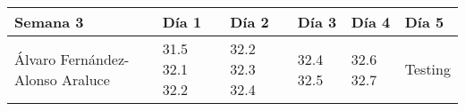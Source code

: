 \begin{table}[h]
	\centering
	\begin{tabular}{| p{2cm} | p{2cm} | p{2cm} | p{2cm} | p{2cm} | p{2cm} |}
		\rowcolor[HTML]{329A9D} 
		{\color[HTML]{FFFFFF} \textbf{Semana 3}} & {\color[HTML]{FFFFFF} \textbf{Día 1}} & {\color[HTML]{FFFFFF} \textbf{Día 2}} & {\color[HTML]{FFFFFF} \textbf{Día 3}} & {\color[HTML]{FFFFFF} \textbf{Día 4}}  & {\color[HTML]{FFFFFF} \textbf{Día 5}} \\ \hline
		Álvaro Fernández-Alonso Araluce & 31.5 32.1 32.2 & 32.2 32.3 32.4 & 32.4 32.5 & 32.6 32.7 & Testing \\ \hline
	\end{tabular}
\end{table}

